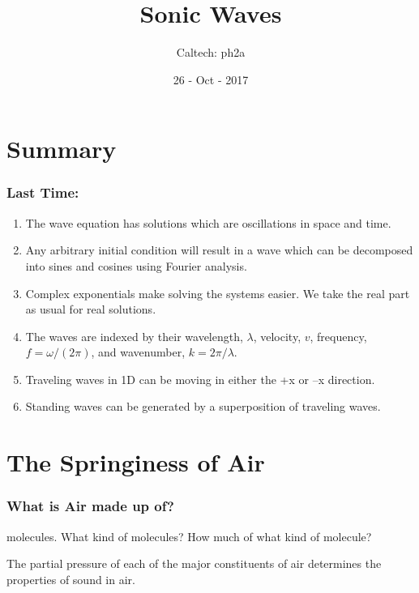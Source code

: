 \documentclass[pdf, handout, hideothersubsections]{beamer}
\begin{document}
\title{Sonic Waves}  
\author{Caltech: ph2a}
\date{26 - Oct - 2017}


\frame{\titlepage} 



\section{Summary}
\begin{frame}
\frametitle{Last Time:}
\begin{enumerate}
  \pause
\item The wave equation has solutions which are oscillations in space
  and time.
  \pause
\item Any arbitrary initial condition will result in a wave which can
  be decomposed into sines and cosines using Fourier analysis.
  \pause
\item Complex exponentials make solving the systems easier. We take
  the real part as usual for real solutions.
  \pause
\item The waves are indexed by their wavelength, $\lambda$, velocity,
  $v$, frequency, $f = \omega / (2 \pi)$, and wavenumber, $k = 2 \pi / \lambda$.
\pause
\item Traveling waves in 1D can be moving in either the +x or --x
  direction.
\pause
\item Standing waves can be generated by a superposition of traveling waves.
\end{enumerate}
\end{frame}


\section{The Springiness of Air}
\begin{frame}
\frametitle{What is Air made up of?}
molecules. What kind of molecules? How much of what kind of molecule?

The partial pressure of each of the major constituents of air
determines the properties of sound in air.


\end{frame}
\end{document}
